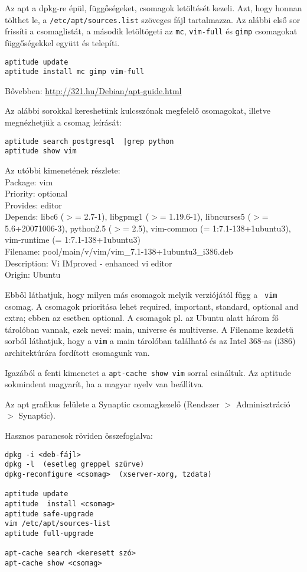 \documentclass[a4paper]{article}
\newcommand{\code}{\texttt}
\begin{document}
Az apt a dpkg-re épül, függőségeket, csomagok letöltését kezeli.
Azt, hogy honnan tölthet le, a \code{/etc/apt/sources.list} szöveges
fájl tartalmazza. Az alábbi első sor frissíti a csomaglistát, a második
letöltögeti az \code{mc}, \code{vim-full} és \code{gimp} csomagokat
függőségekkel együtt és telepíti.
\begin{Verbatim}
aptitude update
aptitude install mc gimp vim-full
\end{Verbatim}
Bővebben: \url{http://321.hu/Debian/apt-guide.html}

Az alábbi sorokkal kereshetünk kulcsszónak megfelelő csomagokat, illetve
megnézhetjük a csomag leírását:
\begin{Verbatim}
aptitude search postgresql  |grep python
aptitude show vim
\end{Verbatim}

Az utóbbi kimenetének részlete:\\
{\small
Package: vim\\
Priority: optional\\
Provides: editor\\
Depends: libc6 ($>$= 2.7-1), libgpmg1 ($>$= 1.19.6-1), libncurses5 ($>$= 5.6+20071006-3), python2.5 ($>$= 2.5), vim-common (= 1:7.1-138+1ubuntu3), vim-runtime (= 1:7.1-138+1ubuntu3)\\
Filename: pool/main/v/vim/vim\_7.1-138+1ubuntu3\_i386.deb\\
Description: Vi IMproved - enhanced vi editor\\
Origin: Ubuntu
} %

Ebből láthatjuk, hogy milyen más csomagok melyik verziójától függ a {\tt
vim} csomag. A csomagok prioritása lehet required, important, standard,
optional and extra; ebben az esetben optional.
A csomagok pl. az Ubuntu alatt három fő tárolóban vannak, ezek nevei:
main, universe és multiverse.
A Filename kezdetű sorból láthatjuk, hogy a {\tt vim} a main tárolóban
található és az Intel 368-as (i386) architektúrára fordított csomagunk van.

Igazából a fenti kimenetet a \code{apt-cache show vim}  sorral
csináltuk. Az aptitude sokmindent magyarít, ha a magyar nyelv van
beállítva.

Az apt grafikus felülete a Synaptic csomagkezelő (Rendszer $>$
Adminisztráció $>$ Synaptic). 

Hasznos parancsok röviden összefoglalva:
\begin{verbatim}
dpkg -i <deb-fájl>
dpkg -l  (esetleg greppel szűrve)
dpkg-reconfigure <csomag>  (xserver-xorg, tzdata)

aptitude update
aptitude  install <csomag>
aptitude safe-upgrade
vim /etc/apt/sources-list
aptitude full-upgrade

apt-cache search <keresett szó>
apt-cache show <csomag>
\end{verbatim}
\end{document}
